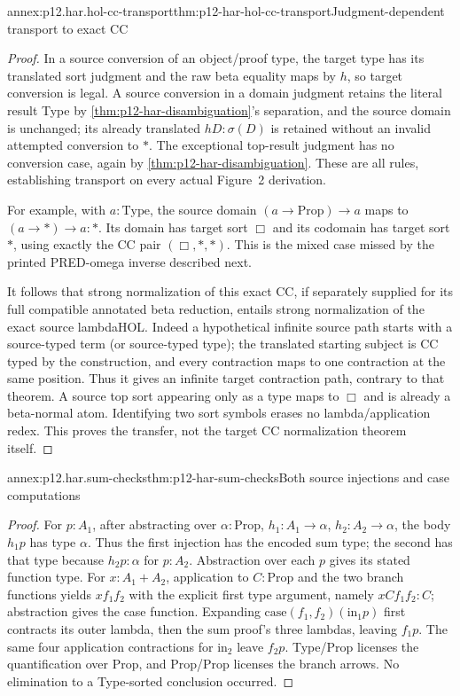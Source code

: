 \begin{annexitem}{annex:p12.har.hol-cc-transport}{thm:p12-har-hol-cc-transport}{Judgment-dependent transport to exact CC}
\begin{proof}
In a source conversion of an object/proof type, the target type has its
translated sort judgment and the raw beta equality maps by \(h\), so
target conversion is legal. A source conversion in a domain judgment
retains the literal result Type by \cref{thm:p12-har-disambiguation}'s separation, and the source domain
is unchanged; its already translated \(hD:\sigma(D)\) is retained
without an invalid attempted conversion to \(\ast\). The exceptional
top-result judgment has no conversion case, again by \cref{thm:p12-har-disambiguation}. These are all
rules, establishing transport on every actual Figure~2 derivation.

For example, with \(a:\mathrm{Type}\), the source domain
\((a\to\mathrm{Prop})\to a\) maps to
\((a\to\ast)\to a:\ast\). Its domain has target sort \(\Box\)
and its codomain has target sort \(\ast\), using exactly the CC pair
\((\Box,\ast,\ast)\). This is the mixed case missed by the printed
PRED-omega inverse described next.

It follows that strong normalization of this exact CC, if separately
supplied for its full compatible annotated beta reduction, entails strong
normalization of the exact source lambdaHOL. Indeed a hypothetical
infinite source path starts with a source-typed term (or source-typed
type); the translated starting subject is CC typed by the construction,
and every contraction maps to one contraction at the same position.
Thus it gives an infinite target contraction path, contrary to that
theorem. A source top sort appearing only as a type maps to \(\Box\)
and is already a beta-normal atom. Identifying two sort symbols erases
no lambda/application redex. This proves the transfer, not the target
CC normalization theorem itself.
\end{proof}
\end{annexitem}

\begin{annexitem}{annex:p12.har.sum-checks}{thm:p12-har-sum-checks}{Both source injections and case computations}
\begin{proof}
For \(p:A_1\), after abstracting over
\(\alpha:\mathrm{Prop}\), \(h_1:A_1\to\alpha\),
\(h_2:A_2\to\alpha\), the body \(h_1p\) has type
\(\alpha\). Thus the first injection has the encoded sum type;
the second has that type because \(h_2p:\alpha\) for
\(p:A_2\). Abstraction over each \(p\) gives its stated
function type. For \(x:A_1+A_2\), application to
\(C:\mathrm{Prop}\) and the two branch functions yields
\(xf_1f_2\) with the explicit first type argument, namely
\(xCf_1f_2:C\); abstraction gives the case function.
Expanding \(\mathrm{case}(f_1,f_2)(\mathrm{in}_1p)\)
first contracts its outer lambda, then the sum proof's three lambdas,
leaving \(f_1p\). The same four application contractions for
\(\mathrm{in}_2\) leave \(f_2p\). Type/Prop licenses the
quantification over Prop, and Prop/Prop licenses the branch arrows.
No elimination to a Type-sorted conclusion occurred.
\end{proof}
\end{annexitem}

